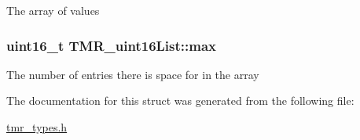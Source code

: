 The array of values \hypertarget{struct_t_m_r__uint16_list_ad0c0d75bab47fbcb4e1d99845dc9a84}{
\subsubsection[{max}]{\setlength{\rightskip}{0pt plus 5cm}uint16\_\-t {\bf TMR\_\-uint16List::max}}}
\label{struct_t_m_r__uint16_list_ad0c0d75bab47fbcb4e1d99845dc9a84}


The number of entries there is space for in the array 

The documentation for this struct was generated from the following file:\begin{CompactItemize}
\item 
\hyperlink{tmr__types_8h}{tmr\_\-types.h}\end{CompactItemize}
